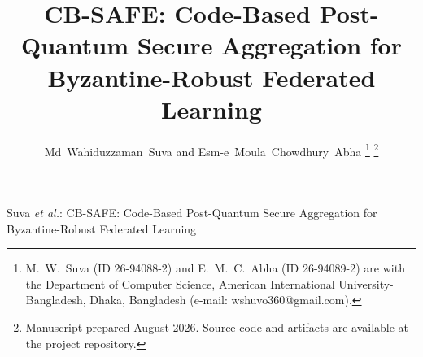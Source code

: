 \documentclass[lettersize,journal]{IEEEtran}
\begin{document}
\title{CB-SAFE: Code-Based Post-Quantum Secure Aggregation for Byzantine-Robust Federated Learning}

\author{Md~Wahiduzzaman~Suva and Esm-e~Moula~Chowdhury~Abha%
\thanks{M.~W.~Suva (ID 26-94088-2) and E.~M.~C.~Abha (ID 26-94089-2) are with the
Department of Computer Science, American International University-Bangladesh,
Dhaka, Bangladesh (e-mail: wshuvo360@gmail.com).}%
\thanks{Manuscript prepared August 2026. Source code and artifacts are available at
the project repository.}}

%
{Suva \MakeLowercase{\textit{et al.}}: CB-SAFE: Code-Based Post-Quantum Secure Aggregation for Byzantine-Robust Federated Learning}

\maketitle
\end{document}
